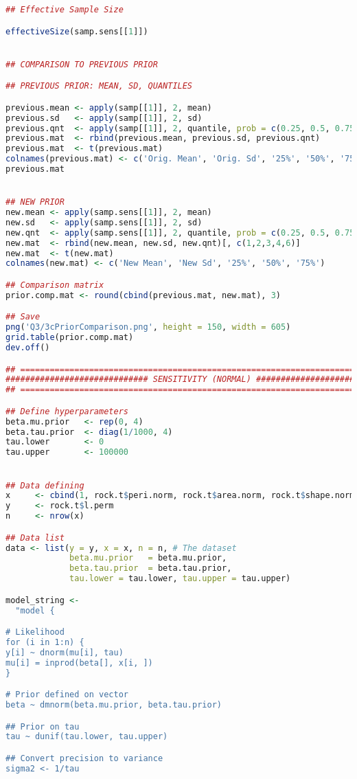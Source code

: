 \documentclass{article}
\begin{document}
\begin{lstlisting}[language=R]
## Effective Sample Size

effectiveSize(samp.sens[[1]])


## COMPARISON TO PREVIOUS PRIOR

## PREVIOUS PRIOR: MEAN, SD, QUANTILES

previous.mean <- apply(samp[[1]], 2, mean)
previous.sd   <- apply(samp[[1]], 2, sd)
previous.qnt  <- apply(samp[[1]], 2, quantile, prob = c(0.25, 0.5, 0.75))
previous.mat  <- rbind(previous.mean, previous.sd, previous.qnt)
previous.mat  <- t(previous.mat)
colnames(previous.mat) <- c('Orig. Mean', 'Orig. Sd', '25%', '50%', '75%')
previous.mat


## NEW PRIOR
new.mean <- apply(samp.sens[[1]], 2, mean)
new.sd   <- apply(samp.sens[[1]], 2, sd)
new.qnt  <- apply(samp.sens[[1]], 2, quantile, prob = c(0.25, 0.5, 0.75))
new.mat  <- rbind(new.mean, new.sd, new.qnt)[, c(1,2,3,4,6)]
new.mat  <- t(new.mat)
colnames(new.mat) <- c('New Mean', 'New Sd', '25%', '50%', '75%')

## Comparison matrix
prior.comp.mat <- round(cbind(previous.mat, new.mat), 3)

## Save
png('Q3/3cPriorComparison.png', height = 150, width = 605)
grid.table(prior.comp.mat)
dev.off()

## ===========================================================================##
############################# SENSITIVITY (NORMAL) #############################
## ===========================================================================##

## Define hyperparameters
beta.mu.prior   <- rep(0, 4)
beta.tau.prior  <- diag(1/1000, 4)
tau.lower       <- 0
tau.upper       <- 100000


## Data defining
x     <- cbind(1, rock.t$peri.norm, rock.t$area.norm, rock.t$shape.norm)
y     <- rock.t$l.perm
n     <- nrow(x)

## Data list
data <- list(y = y, x = x, n = n, # The dataset 
             beta.mu.prior   = beta.mu.prior, 
             beta.tau.prior  = beta.tau.prior,
             tau.lower = tau.lower, tau.upper = tau.upper)

model_string <-   
  "model {

# Likelihood
for (i in 1:n) {
y[i] ~ dnorm(mu[i], tau)
mu[i] = inprod(beta[], x[i, ])
}

# Prior defined on vector
beta ~ dmnorm(beta.mu.prior, beta.tau.prior)

## Prior on tau
tau ~ dunif(tau.lower, tau.upper)

## Convert precision to variance
sigma2 <- 1/tau


\end{lstlisting}
\end{document}
